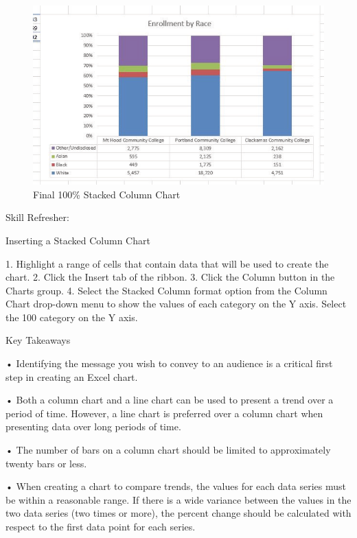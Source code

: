 \begin{figure}[H]
	\centering
	\includegraphics[width=\maxwidth{.95\linewidth}]{gfx/ch04_fig28}
	\caption{Final 100\% Stacked Column Chart}
	\label{04:fig28}
\end{figure}


Skill Refresher:


Inserting a Stacked Column Chart

1. Highlight a range of cells that contain data that will be used to create the chart.
2. Click the Insert tab of the ribbon.
3. Click the Column button in the Charts group.
4. Select the Stacked Column format option from the Column Chart drop-down menu to show the values of
each category on the Y axis. Select the 100%
category on the Y axis.




Key Takeaways


• Identifying the message you wish to convey to an audience is a critical first step in creating an Excel chart.

• Both a column chart and a line chart can be used to present a trend over a period of time. However, a line
chart is preferred over a column chart when presenting data over long periods of time.

• The number of bars on a column chart should be limited to approximately twenty bars or less.

• When creating a chart to compare trends, the values for each data series must be within a reasonable range.
If there is a wide variance between the values in the two data series (two times or more), the percent change
should be calculated with respect to the first data point for each series.

